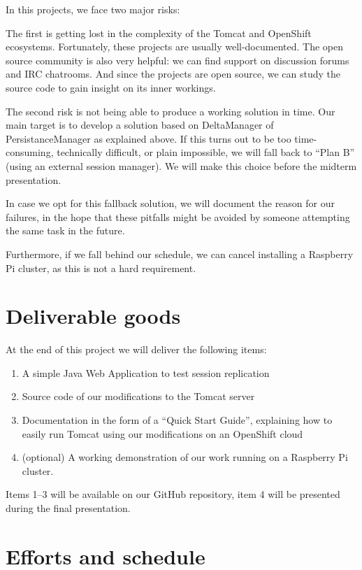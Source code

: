 \documentclass[11pt,a4paper]{article}
\begin{document}
In this projects, we face two major risks:

The first is getting lost in the complexity of the Tomcat and OpenShift
ecosystems. Fortunately, these projects are usually well-documented. The open
source community is also very helpful: we can find support on discussion forums
and IRC chatrooms. And since the projects are open source, we can study the
source code to gain insight on its inner workings.

The second risk is not being able to produce a working solution in time. Our
main target is to develop a solution based on DeltaManager of
PersistanceManager as explained above. If this turns out to be too
time-consuming, technically difficult, or plain impossible, we will fall back
to ``Plan B'' (using an external session manager). We will make this choice
before the midterm presentation.

In case we opt for this fallback solution, we
will document the reason for our failures, in the hope that these pitfalls
might be avoided by someone attempting the same task in the future.

Furthermore, if we fall behind our schedule, we can cancel installing a
Raspberry Pi cluster, as this is not a hard requirement.

\section{Deliverable goods}

At the end of this project we will deliver the following items:

\begin{enumerate}
    \item A simple Java Web Application to test session replication
    \item Source code of our modifications to the Tomcat server
    \item Documentation in the form of a ``Quick Start Guide'', explaining how
        to easily run Tomcat using our modifications on an OpenShift cloud
    \item (optional) A working demonstration of our work running on a Raspberry
        Pi cluster.
\end{enumerate}

Items 1--3 will be available on our GitHub repository, item 4 will be presented
during the final presentation.

\section{Efforts and schedule}
\end{document}
